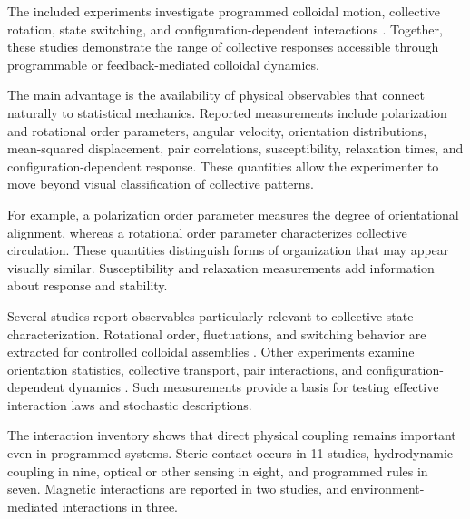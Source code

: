 The included experiments investigate programmed colloidal
motion, collective rotation, state switching, and
configuration-dependent interactions
\cite{Martinet2022rotationcontrolin,Yan2014colloidalsuperstruc,Chen2024synchronousandfull,Buerle2020formationofstable,Aubret2021metamachinesofplur,Heuthe2025tunablecolloidalsw,Knippenberg2022roleofcohesionin,Lffler2023collectiveforaging,Han2020programmablechiral,Chen2022collectiveresponse,Guo2026afeedbackcontrolle,Chen2024persistentandrespo,Lffler2021behaviordependentc}.
Together, these studies demonstrate the range of
collective responses accessible through programmable
or feedback-mediated colloidal dynamics.

The main advantage is the availability of physical
observables that connect naturally to statistical
mechanics. Reported measurements include polarization
and rotational order parameters, angular velocity,
orientation distributions, mean-squared displacement,
pair correlations, susceptibility, relaxation times,
and configuration-dependent response. These quantities
allow the experimenter to move beyond visual
classification of collective patterns.

For example, a polarization order parameter measures
the degree of orientational alignment, whereas a
rotational order parameter characterizes collective
circulation. These quantities distinguish forms of
organization that may appear visually similar.
Susceptibility and relaxation measurements add
information about response and stability.

Several studies report observables particularly
relevant to collective-state characterization.
Rotational order, fluctuations, and switching
behavior are extracted for controlled colloidal
assemblies
\cite{Chen2024synchronousandfull,Buerle2020formationofstable,Chen2024persistentandrespo,Lffler2021behaviordependentc}.
Other experiments examine orientation statistics,
collective transport, pair interactions, and
configuration-dependent dynamics
\cite{Martinet2022rotationcontrolin,Heuthe2025tunablecolloidalsw,Chen2022collectiveresponse,Guo2026afeedbackcontrolle}.
Such measurements provide a basis for testing
effective interaction laws and stochastic
descriptions.

The interaction inventory shows that direct physical
coupling remains important even in programmed systems.
Steric contact occurs in 11 studies, hydrodynamic
coupling in nine, optical or other sensing in eight,
and programmed rules in seven. Magnetic interactions
are reported in two studies, and environment-mediated
interactions in three.

